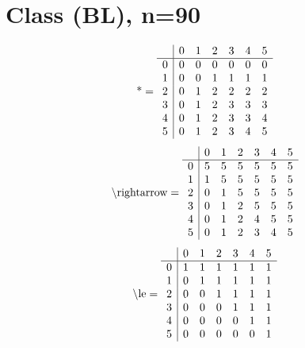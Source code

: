 \documentclass[11pt]{article}
\begin{document}
\section{Class (BL), n=90}
\[\text{*} = 
\begin{array}{r | r r r r r r}
 & 0 & 1 & 2 & 3 & 4 & 5 \\ \hline
0 & 0 & 0 & 0 & 0 & 0 & 0 \\
1 & 0 & 0 & 1 & 1 & 1 & 1 \\
2 & 0 & 1 & 2 & 2 & 2 & 2 \\
3 & 0 & 1 & 2 & 3 & 3 & 3 \\
4 & 0 & 1 & 2 & 3 & 3 & 4 \\
5 & 0 & 1 & 2 & 3 & 4 & 5 \\
\end{array}
\]
\[\text{\textbackslash rightarrow} = 
\begin{array}{r | r r r r r r}
 & 0 & 1 & 2 & 3 & 4 & 5 \\ \hline
0 & 5 & 5 & 5 & 5 & 5 & 5 \\
1 & 1 & 5 & 5 & 5 & 5 & 5 \\
2 & 0 & 1 & 5 & 5 & 5 & 5 \\
3 & 0 & 1 & 2 & 5 & 5 & 5 \\
4 & 0 & 1 & 2 & 4 & 5 & 5 \\
5 & 0 & 1 & 2 & 3 & 4 & 5 \\
\end{array}
\]
\[\text{\textbackslash le} = 
\begin{array}{r | r r r r r r}
 & 0 & 1 & 2 & 3 & 4 & 5 \\ \hline
0 & 1 & 1 & 1 & 1 & 1 & 1 \\
1 & 0 & 1 & 1 & 1 & 1 & 1 \\
2 & 0 & 0 & 1 & 1 & 1 & 1 \\
3 & 0 & 0 & 0 & 1 & 1 & 1 \\
4 & 0 & 0 & 0 & 0 & 1 & 1 \\
5 & 0 & 0 & 0 & 0 & 0 & 1 \\
\end{array}
\]
\end{document}
